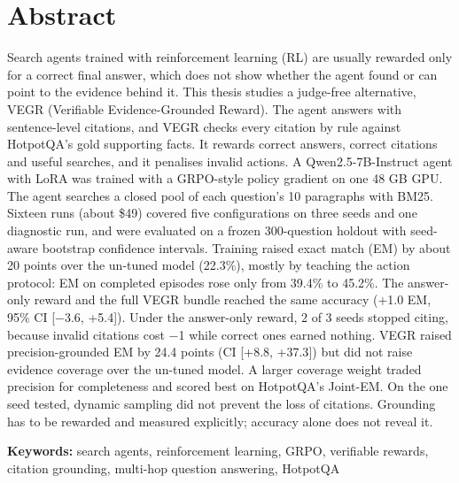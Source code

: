 \section*{Abstract}\label{abstract}

Search agents trained with reinforcement learning (RL) are usually
rewarded only for a correct final answer, which does not show whether
the agent found or can point to the evidence behind it. This thesis
studies a judge-free alternative, VEGR (Verifiable Evidence-Grounded
Reward). The agent answers with sentence-level citations, and VEGR
checks every citation by rule against HotpotQA's gold supporting facts.
It rewards correct answers, correct citations and useful searches, and
it penalises invalid actions. A Qwen2.5-7B-Instruct agent with LoRA was
trained with a GRPO-style policy gradient on one 48 GB GPU. The agent
searches a closed pool of each question's 10 paragraphs with BM25.
Sixteen runs (about \$49) covered five configurations on three seeds and
one diagnostic run, and were evaluated on a frozen 300-question holdout
with seed-aware bootstrap confidence intervals. Training raised exact
match (EM) by about 20 points over the un-tuned model (22.3\%), mostly
by teaching the action protocol: EM on completed episodes rose only from
39.4\% to 45.2\%. The answer-only reward and the full VEGR bundle
reached the same accuracy (+1.0 EM, 95\% CI {[}−3.6, +5.4{]}). Under the
answer-only reward, 2 of 3 seeds stopped citing, because invalid
citations cost −1 while correct ones earned nothing. VEGR raised
precision-grounded EM by 24.4 points (CI {[}+8.8, +37.3{]}) but did not
raise evidence coverage over the un-tuned model. A larger coverage
weight traded precision for completeness and scored best on HotpotQA's
Joint-EM. On the one seed tested, dynamic sampling did not prevent the
loss of citations. Grounding has to be rewarded and measured explicitly;
accuracy alone does not reveal it.

\textbf{Keywords:} search agents, reinforcement learning, GRPO,
verifiable rewards, citation grounding, multi-hop question answering,
HotpotQA
